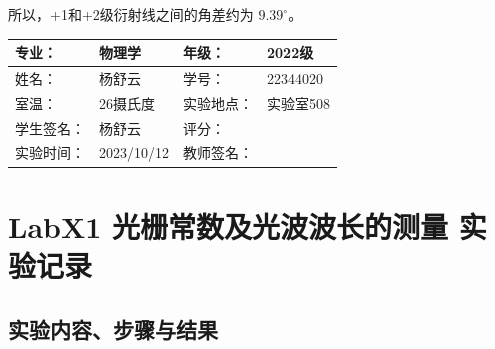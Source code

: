 \documentclass[dvipsnames, svgnames,a4paper,11pt]{article}
\begin{document}
		所以，+1和+2级衍射线之间的角差约为 \(9.39^\circ\)。	



	\clearpage
	\begin{table}
		\renewcommand\arraystretch{1.7}
		\centering
		\begin{tabularx}{\textwidth}{|X|X|X|X|}
			\hline
			专业： & 物理学 & 年级： & 2022级 \\
			\hline
			姓名： & 杨舒云 & 学号： & 22344020\\
			\hline
			室温： & 26摄氏度 & 实验地点： & 实验室508 \\
			\hline
			学生签名：& 杨舒云 & 评分： &\\
			\hline
			实验时间：& 2023/10/12 & 教师签名：&\\
			\hline
		\end{tabularx}
	\end{table}
	
	\section{LabX1 光栅常数及光波波长的测量 \quad\heiti 实验记录}
	\subsection{实验内容、步骤与结果}
\end{document}
